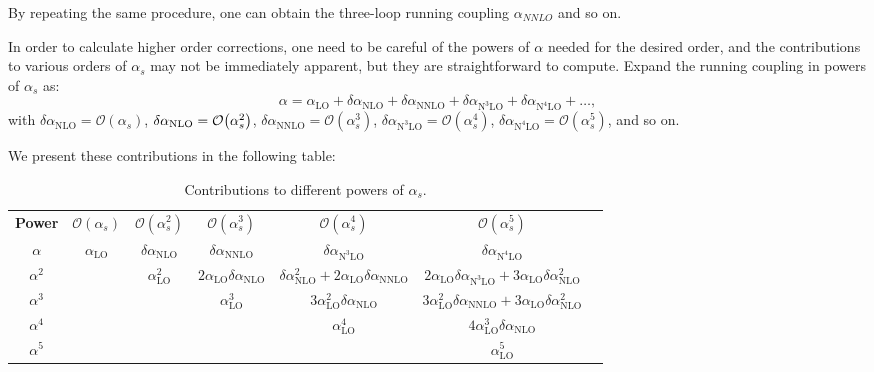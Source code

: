 \documentclass[../Tesi_Jiahao_Miao_986136.tex]{subfiles}
\begin{document}
By repeating the same procedure, one can obtain the three-loop running coupling $\alpha_{NNLO}$ and so on.

In order to calculate higher order corrections, one need to be careful of the powers of $\alpha$ needed for the desired order, 
and the contributions to various orders of $\alpha_s$ may not be immediately apparent, but they are straightforward to compute.
Expand the running coupling in powers of $\alpha_s$ as: 
\begin{equation}
    \alpha = \alpha_{\text{LO}} + \delta\alpha_{\text{NLO}} + \delta\alpha_{\text{NNLO}} + \delta\alpha_{\text{N}^3\text{LO}} + \delta\alpha_{\text{N}^4\text{LO}} + \ldots,
\end{equation} 
with $\delta\alpha_{\text{NLO}} = \mathcal{O}(\alpha_s)$, $\delta\alpha_{\text{NLO}} = \order{\alpha_s^2}$, $\delta\alpha_{\text{NNLO}} = \mathcal{O}(\alpha_s^3)$,
$\delta\alpha_{\text{N}^3\text{LO}} = \mathcal{O}(\alpha_s^4)$, $\delta\alpha_{\text{N}^4\text{LO}} = \mathcal{O}(\alpha_s^5)$, and so on.

We present these contributions in the following table:
\begin{table}[htbp] %
    \centering
    \caption{Contributions to different powers of $\alpha_s$.}
    \begin{tabular}{c c c c c c c}
        \textbf{Power} & $\mathcal{O}(\alpha_s)$ & $\mathcal{O}(\alpha_s^2)$ & $\mathcal{O}(\alpha_s^3)$ 
        & $\mathcal{O}(\alpha_s^4)$ & $\mathcal{O}(\alpha_s^5)$\\
     
        $\alpha$ & $\alpha_{\text{LO}}$ & $\delta\alpha_{\text{NLO}}$ & $\delta\alpha_{\text{NNLO}}$ & $\delta\alpha_{\text{N}^3\text{LO}}$ & $\delta\alpha_{\text{N}^4\text{LO}}$  \\
        $\alpha^2$ &  & $\alpha_{\text{LO}}^2$ & $2\alpha_{\text{LO}}\delta\alpha_{\text{NLO}}$ & $\delta\alpha_{\text{NLO}}^2+2\alpha_{\text{LO}}\delta\alpha_{\text{NNLO}}$ &
        $2\alpha_{\text{LO}}\delta\alpha_{\text{N}^3\text{LO}}+3\alpha_{\text{LO}}\delta\alpha_{\text{NLO}}^2$ \\
        $\alpha^3$ &  & & $\alpha_{\text{LO}}^3$ & $3\alpha_{\text{LO}}^2 \delta\alpha_{\text{NLO}}$& $3\alpha_{\text{LO}}^2\delta\alpha_{\text{NNLO}}+3\alpha_{\text{LO}}\delta\alpha_{\text{NLO}}^2$  \\
        $\alpha^4$ &  & & & $\alpha_{\text{LO}}^4$ & $4 \alpha_{\text{LO}}^3 \delta\alpha_{\text{NLO}}$  \\
        $\alpha^5$ &  & & & & $\alpha_{\text{LO}}^5$ \\
    \end{tabular}
    \label{tab:contributions to different powers of alpha_s}
\end{table}
\end{document}
